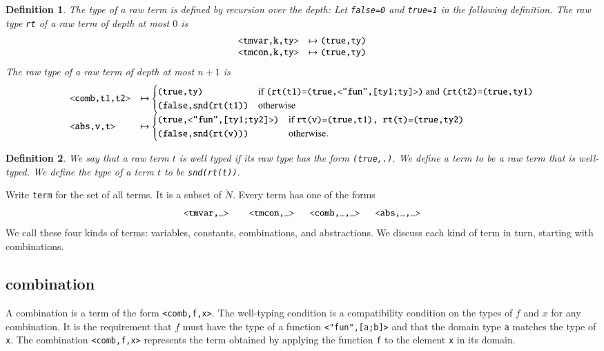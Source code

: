 \documentclass[cup9a]{cupbook}
\newtheorem{definition}{Definition}[chapter]
\begin{document}
\begin{definition} The type of a raw term is defined by recursion over the depth: Let \verb!false=0! and \verb!true=1! in
the following definition.
The raw type \verb!rt! of a raw term of depth at most $0$ is
$$
\begin{array}{lll}
\verb!<tmvar,k,ty>!&\mapsto \verb!(true,ty)!\\
\verb!<tmcon,k,ty>!&\mapsto \verb!(true,ty)!
\end{array}
$$
The raw type of a raw term of depth at most $n+1$ is
$$
\begin{array}{lll}
\verb!<comb,t1,t2>!&\mapsto 
\begin{cases}
\verb!(true,ty)! &\hbox{if } \verb!(rt(t1)=(true,<"fun",[ty1;ty]>)! \hbox{ and } \verb!(rt(t2)=(true,ty1)!\\
\verb!(false,snd(rt(t1))! & \hbox{otherwise}
\end{cases}\\
\verb!<abs,v,t>!&\mapsto
 \begin{cases}
\verb!(true,<"fun",[ty1;ty2]>)!&\hbox{if } \verb!rt(v)=(true,t1), rt(t)=(true,ty2)!\\
\verb!(false,snd(rt(v)))!&\hbox{otherwise}.
\end{cases}
\end{array}
$$
\end{definition}

\begin{definition}
We say that a raw term $t$ is well typed if its raw type has the form \verb!(true,.)!.  We define a term to be a raw term that is well-typed.  We define the type of a term $t$ to be \verb!snd(rt(t))!.
\end{definition}

Write \verb!term! for the set of all terms.  It is a subset of $\ring{N}$.  Every term has one of the forms
$$
\verb!<tmvar,_>    <tmcon,_>   <comb,_,_>   <abs,_,_>!
$$
We call these four kinds of terms: variables, constants,
combinations, and abstractions.  We discuss each kind
of term in turn, starting with combinations.


\subsection{combination}

A combination is a term of the form \verb!<comb,f,x>!.  The well-typing condition is a compatibility condition on the types of $f$ and $x$ for any combination.  It is the requirement that $f$ must have the type of a function
\verb!<"fun",[a;b]>! and that the domain type \verb!a! matches the type of \verb!x!.  The combination \verb!<comb,f,x>! represents the term obtained by applying the function \verb!f! to the element \verb!x! in its domain.
\end{document}
